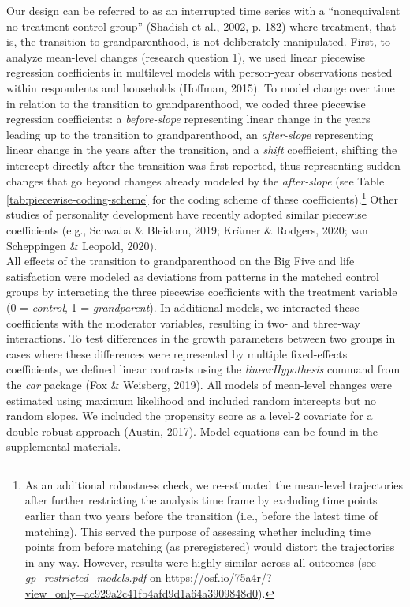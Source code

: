 \documentclass[
  english,
  man,floatsintext]{apa7}
\begin{document}
Our design can be referred to as an interrupted time series with a \enquote{nonequivalent no-treatment control group} (Shadish et al., 2002, p. 182) where treatment, that is, the transition to grandparenthood, is not deliberately manipulated. First, to analyze mean-level changes (research question 1), we used linear piecewise regression coefficients in multilevel models with person-year observations nested within respondents and households (Hoffman, 2015). To model change over time in relation to the transition to grandparenthood, we coded three piecewise regression coefficients: a \emph{before-slope} representing linear change in the years leading up to the transition to grandparenthood, an \emph{after-slope} representing linear change in the years after the transition, and a \emph{shift} coefficient, shifting the intercept directly after the transition was first reported, thus representing sudden changes that go beyond changes already modeled by the \emph{after-slope} (see Table \ref{tab:piecewise-coding-scheme} for the coding scheme of these coefficients).\footnote{As an additional robustness check, we re-estimated the mean-level trajectories after further restricting the analysis time frame by excluding time points earlier than two years before the transition (i.e., before the latest time of matching). This served the purpose of assessing whether including time points from before matching (as preregistered) would distort the trajectories in any way. However, results were highly similar across all outcomes (see \emph{gp\_restricted\_models.pdf} on \url{https://osf.io/75a4r/?view_only=ac929a2c41fb4afd9d1a64a3909848d0}).} Other studies of personality development have recently adopted similar piecewise coefficients (e.g., Schwaba \& Bleidorn, 2019; Krämer \& Rodgers, 2020; van Scheppingen \& Leopold, 2020).\\
All effects of the transition to grandparenthood on the Big Five and life satisfaction were modeled as deviations from patterns in the matched control groups by interacting the three piecewise coefficients with the treatment variable (0 = \emph{control}, 1 = \emph{grandparent}). In additional models, we interacted these coefficients with the moderator variables, resulting in two- and three-way interactions. To test differences in the growth parameters between two groups in cases where these differences were represented by multiple fixed-effects coefficients, we defined linear contrasts using the \emph{linearHypothesis} command from the \emph{car} package (Fox \& Weisberg, 2019). All models of mean-level changes were estimated using maximum likelihood and included random intercepts but no random slopes. We included the propensity score as a level-2 covariate for a double-robust approach (Austin, 2017). Model equations can be found in the supplemental materials.\\
\end{document}
